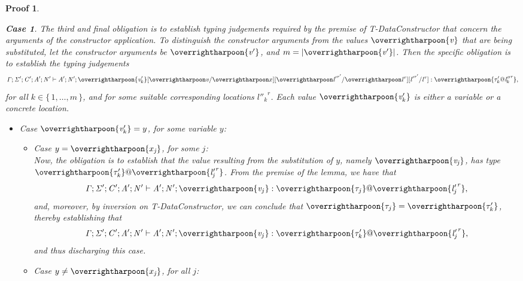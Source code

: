 \documentclass[showabstract,showacknowledgments,showpreface,showdedication,school]{iuphd}
\makeatletter
\newtheorem*{bcase}{Case}
\theoremstyle{nonumberplain}
\newtheorem{nproof}{Proof}
\newcommand{\keywd}[1]{\mathit{#1}}
\newcommand{\skeywd}[1]{\mathit{#1}}
\newcommand{\TYP}{\keywd{\tau}}
\newcommand{\var}{\svar}
\newcommand{\svar}{x}
\newcommand{\yvar}{y}
\newcommand{\loc}{\skeywd{l}}
\newcommand{\reg}{\skeywd{r}}
\newcommand{\indj}{\keywd{j}}
\newcommand{\VAL}{\keywd{v}}
\newcommand\set[1]{\{ \, \ensuremath{#1} \,\}}
\newcommand{\CENV}{\keywd{C}}
\newcommand{\TENV}{\keywd{\Gamma}}
\newcommand{\SENV}{\keywd{\Sigma}}
\newcommand{\AENV}{\keywd{A}}
\newcommand{\NENV}{\keywd{N}}
\newcommand{\locreg}[2]{\ensuremath{{#1}^{#2}}}
\newcommand{\tyatlocreg}[3]{#1 \ensuremath{@} \locreg{#2}{#3}}
\newcommand{\tdatacon}{T-DataConstructor}
\newcommand{\overharpoon}[1]{\overrightharpoon{#1}}
\makeatother
\begin{document}
\begin{nproof}
\begin{bcase}
    The third and final obligation is to establish typing judgements required by the premise of \tdatacon{}
    that concern the arguments of the constructor application.
    To distinguish the constructor arguments from the values $\overharpoon{\VAL}$ that are being substituted,
    let the constructor arguments be $\overharpoon{\VAL'}$, and $m = |\overharpoon{\VAL'}|$.
    Then the specific obligation is to establish the typing judgements
    \begin{displaymath}
       \TENV;\SENV';\CENV';\AENV';\NENV' \vdash \AENV';\NENV';\substlemmasubsts{\overharpoon{\VAL'_{k}}} : \overharpoon{\tyatlocreg{\TYP_{k}'}{\loc''_{k}}{\reg}},
     \end{displaymath}
     for all $k \in \set{1, \ldots, m}$, and for some suitable corresponding locations
     $\locreg{\loc''_{k}}{\reg}$.
     Each value $\overharpoon{\VAL'_k}$ is either a variable or a concrete location.
    \begin{itemize}
    \item Case $\overharpoon{\VAL'_k} = \yvar$, for some variable $\yvar$:\\
      \begin{itemize}
      \item Case $\yvar = \overharpoon{\var_{\indj}}$, for some $\indj$:\\
        Now, the obligation is to establish that the value resulting from the substitution of $\yvar$, namely
        $\overharpoon{\VAL_{\indj}}$, has type $\overharpoon{\TYP'_{k}} \ensuremath{@} \overharpoon{\locreg{\loc'_{\indj}}{\reg}}$.
        From the premise of the lemma, we have that
        \begin{displaymath}
        \TENV; \SENV'; \CENV'; \AENV'; \NENV' \vdash \AENV'; \NENV'; \overharpoon{\VAL_j} : \overharpoon{\TYP_j} \ensuremath{@} \overharpoon{\locreg{\loc'_j}{\reg}},
        \end{displaymath}
        and, moreover, by inversion on \tdatacon{}, we can conclude that $\overharpoon{\TYP_j} = \overharpoon{\TYP'_k}$,
        thereby establishing that
       \begin{displaymath}
        \TENV; \SENV'; \CENV'; \AENV'; \NENV' \vdash \AENV'; \NENV'; \overharpoon{\VAL_j} : \overharpoon{\TYP'_k} \ensuremath{@} \overharpoon{\locreg{\loc'_j}{\reg}},
        \end{displaymath}
        and thus discharging this case.
      \item Case $\yvar \neq \overharpoon{\var_{\indj}}$, for all $\indj$:\\

\end{itemize}
\end{itemize}
\end{bcase}
\end{nproof}
\end{document}
